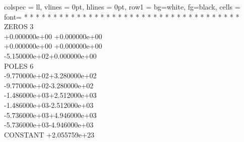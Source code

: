 \begin{longtblr}{
		colspec = {ll},
		vlines  = 0pt,
		hlines  = 0pt,
		row{1}  = {bg=white, fg=black},
		cells = {font=\ttfamily}
	}
	 * * * * * * * * * * * * * * * * * * * * * * * * * * * * * * * * * * * * \\
	 ZEROS 3 \\
	 \hspace{1cm}+0.000000e+00 +0.000000e+00 \\
	 \hspace{1cm}+0.000000e+00 +0.000000e+00 \\
	 \hspace{1cm}-5.150000e+02+0.000000e+00 \\
	 POLES 6 \\
	 \hspace{1cm}-9.770000e+02+3.280000e+02 \\
	 \hspace{1cm}-9.770000e+02-3.280000e+02 \\
	 \hspace{1cm}-1.486000e+03+2.512000e+03 \\
	 \hspace{1cm}-1.486000e+03-2.512000e+03 \\
	 \hspace{1cm}-5.736000e+03+4.946000e+03 \\
	 \hspace{1cm}-5.736000e+03-4.946000e+03 \\
	 CONSTANT +2.055759e+23 \\
\end{longtblr}
